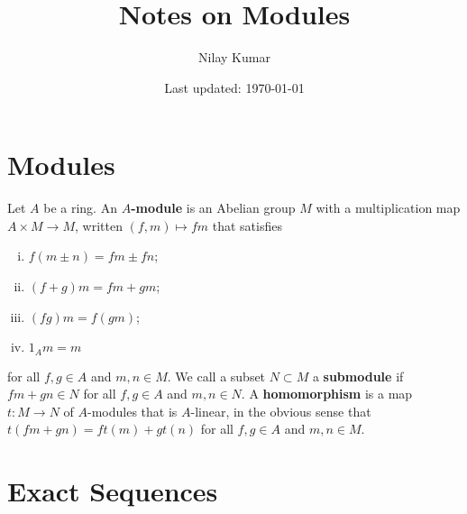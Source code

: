 \documentclass{../../mathnotes}
\title{Notes on Modules}
\author{Nilay Kumar}
\date{Last updated: \today}
\begin{document}
\maketitle

\setcounter{section}{-1}

\section{Modules}

Let $A$ be a ring. An \textbf{$A$-module} is an Abelian group $M$ with a multiplication map $A\times M\to M$, written $(f,m)\mapsto fm$
that satisfies
\begin{enumerate}[(i)]
    \item $f(m\pm n)=fm\pm fn$;
    \item $(f+g)m=fm+gm$;
    \item $(fg)m=f(gm)$;
    \item $1_Am=m$
\end{enumerate}
for all $f,g\in A$ and $m,n\in M$. We call a subset $N\subset M$ a \textbf{submodule} if $fm+gn\in N$ for all $f,g\in A$ and $m,n\in N$.
A \textbf{homomorphism} is a map $t:M\to N$ of $A$-modules that is $A$-linear, in the obvious sense that $t(fm+gn)=ft(m)+gt(n)$ for all $f,g\in A$
and $m,n\in M$.


\section{Exact Sequences}










\end{document}
